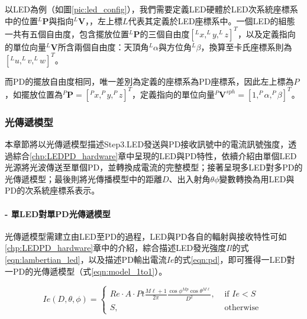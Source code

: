         以LED為例（如圖\ref{pic:led_config}），我們需要定義LED硬體於LED次系統座標系中的位置$^{L}\boldsymbol{P}$與指向$^{L}\boldsymbol{V}$，，左上標$L$代表其定義於LED座標系中。一個LED的組態一共有五個自由度，包含擺放位置$^L \boldsymbol{P}$的三個自由度$[^Lx,^Ly,^Lz]^T$，以及定義指向的單位向量$^L\boldsymbol{V}$所含兩個自由度：天頂角$^L\alpha$與方位角$^L\beta$，換算至卡氏座標系則為$[^Lu,^Lv,^Lw]^T$。

        而PD的擺放自由度相同，唯一差別為定義的座標系為PD座標系，因此左上標為$P$，如擺放位置為$^P \boldsymbol{P}=[^Px,^Py,^Pz]^T$，定義指向的單位向量$^P\boldsymbol{V}^{sph}=[1,^P\alpha,^P\beta]^T$。

    \subsubsection{光傳遞模型}
    \label{chp:model}


    本章節將以光傳遞模型描述Step3.LED發送與PD接收訊號中的電流訊號強度，透過綜合\ref{chp:LEDPD_hardware}章中呈現的LED與PD特性，依續介紹由單個LED光源將光波傳送至單個PD，並轉換成電流的完整模型；接著呈現多LED對多PD的光傳遞模型；最後則將光傳播模型中的距離$D$、出入射角$\theta\phi$變數轉換為用LED與PD的次系統座標系表示。
            
    \paragraph*{- 單LED對單PD光傳遞模型}

        \hfill
    
        光傳遞模型需建立由LED至PD的過程，LED與PD各自的輻射與接收特性可如\ref{chp:LEDPD_hardware}章中的介紹，綜合描述LED發光強度$Il$的式\ref{eqn:lambertian_led}，以及描述PD輸出電流$Ie$的式\ref{eqn:pd}，即可獲得一LED對一PD的光傳遞模型（式\ref{eqn:model_1to1}）。
    
        \begin{equation}
            \label{eqn:model_1to1}
            Ie(D,\theta,\phi) = \begin{cases}Re \cdot A\cdot Pt\frac{M\ell+1}{2\pi}\frac{\cos \phi^{Mp}\cos \theta^{M\ell}}{D^2}, & \text { if } Ie<S \\ S, & \text { otherwise }\end{cases}
        \end{equation}
    
